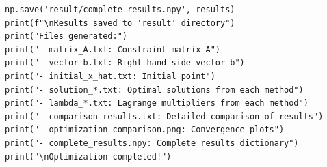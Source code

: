 \documentclass{article}
\newenvironment{solution_cn}{%
  \begin{proof}[解答]%
  \kaishu  %
}{%
  \end{proof}%
}
\begin{document}
\begin{solution_cn}
\begin{lstlisting}[caption={run.py}]
np.save('result/complete_results.npy', results)
print(f"\nResults saved to 'result' directory")
print("Files generated:")
print("- matrix_A.txt: Constraint matrix A")
print("- vector_b.txt: Right-hand side vector b") 
print("- initial_x_hat.txt: Initial point")
print("- solution_*.txt: Optimal solutions from each method")
print("- lambda_*.txt: Lagrange multipliers from each method")
print("- comparison_results.txt: Detailed comparison of results")
print("- optimization_comparison.png: Convergence plots")
print("- complete_results.npy: Complete results dictionary")
print("\nOptimization completed!")
\end{lstlisting}
\end{solution_cn}
\end{document}

